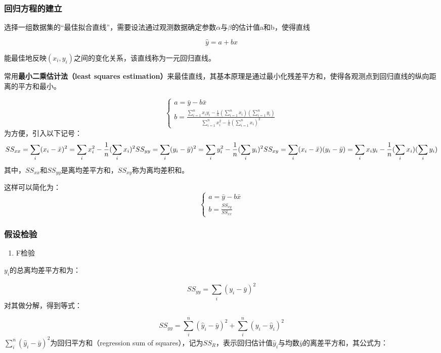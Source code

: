 \documentclass[
  letterpaper,
  DIV=11,
  numbers=noendperiod]{scrartcl}
\providecommand{\tightlist}{%
  \setlength{\itemsep}{0pt}\setlength{\parskip}{0pt}}\usepackage{longtable,booktabs,array}
\begin{document}
\subsubsection{回归方程的建立}\label{ux56deux5f52ux65b9ux7a0bux7684ux5efaux7acb}

选择一组数据集的``最佳拟合直线''，需要设法通过观测数据确定参数\(\alpha\)与\(\beta\)的估计值a和b，使得直线

\[\hat y=a+bx\]

能最佳地反映\((x_i,y_i)\)之间的变化关系，该直线称为一元回归直线。

常用\textbf{最小二乘估计法（least squares
estimation）}来最佳直线，其基本原理是通过最小化残差平方和，使得各观测点到回归直线的纵向距离的平方和最小。

\[
\begin{cases}
a=\bar y-b \bar x\\
b=\frac{\sum\limits_{i=1}^n x_i y_i - \frac{1}{n}(\sum\limits_{i=1}^n x_i)(\sum\limits_{i=1}^n y_i)}{\sum\limits_{i=1}^n x_i^2 - \frac{1}{n}(\sum\limits_{i=1}^n x_i)^2}
\end{cases}
\] 为方便，引入以下记号： \[
SS_{xx}=\sum_{i}(x_i-\bar x)^2=\sum_{i}x_i^2-\frac{1}{n}(\sum_{i}x_i)^2\\
SS_{yy}=\sum_{i}(y_i-\bar y)^2=\sum_{i}y_i^2-\frac{1}{n}(\sum_{i}y_i)^2\\
SS_{xy}=\sum_{i}(x_i-\bar x)(y_i-\bar y)=\sum_{i}x_i y_i-\frac{1}{n}(\sum_{i}x_i)(\sum_{i}y_i)
\]
其中，\(SS_{xx}\)和\(SS_{yy}\)是离均差平方和，\(SS_{xy}\)称为离均差积和。

这样可以简化为： \[
\begin{cases}
a=\bar y-b \bar x\\
b=\frac{SS_{xy}}{SS_{xx}}
\end{cases}
\]

\subsubsection{假设检验}\label{ux5047ux8bbeux68c0ux9a8c}

\begin{enumerate}
\def\labelenumi{\arabic{enumi}.}
\tightlist
\item
  F检验
\end{enumerate}

\(y_i\)的总离均差平方和为：

\[SS_{yy}=\sum_{i}(y_i-\bar y)^2\] 对其做分解，得到等式：

\[SS_{yy}=\sum_{i}^{n}(\hat y_i-\bar y)^2+\sum_{i}^{n}(y_i-\hat y_i)^2\]
\(\sum_{i}^{n}(\hat y_i-\bar y)^2\)为回归平方和（regression sum of
squares），记为\(SS_R\)，表示回归估计值\(\hat y_i\)与均数\(\bar y\)的离差平方和，其公式为：
\end{document}
